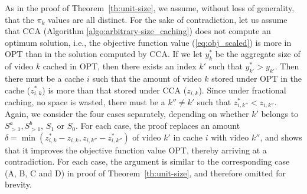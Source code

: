 \documentclass[conference]{IEEEtran}
\begin{document}
As in the proof of Theorem~\ref{th:unit-size}, we assume, without loss of generality, that the $\pi_k$ values are all distinct. For the sake of contradiction, let us assume that CCA (Algorithm \ref{algo:arbitrary-size_caching}) does not compute an optimum solution, i.e., the objective function value (\ref{eq:obj_scaled}) is more in OPT than in the solution computed by CCA. If we let $y^*_k$ be the aggregate size of of video $k$ cached in OPT, then there exists an index $k'$ such that $y^*_{k'} > y_{k'}$. Then there must be a cache $i$ such that the amount of video $k$ stored under OPT in the cache ($z^*_{i,k}$) is more than that stored under CCA ($z_{i,k}$). Since under fractional caching, no space is wasted, there must be a $k'' \neq k'$ such that $z^*_{i,k''} < z_{i,k''}$. 
Again, we consider the four cases separately, depending on whether $k'$ belongs to $S^a_{>1}, S^b_{>1}$, $S_{1}$ or $S_{0}$. For each case, the proof replaces an amount $\delta = \min (z^*_{i,k}-z_{i,k}, z_{i,k''}-z^*_{i,k''})$ of video $k'$ in cache $i$ with video $k''$, and shows that it improves the objective function value OPT, thereby arriving at a contradiction. For each case, the argument is similar to the corresponding case (A, B, C and D) in proof of Theorem~\ref{th:unit-size}, and therefore omitted for brevity.
\end{document}
